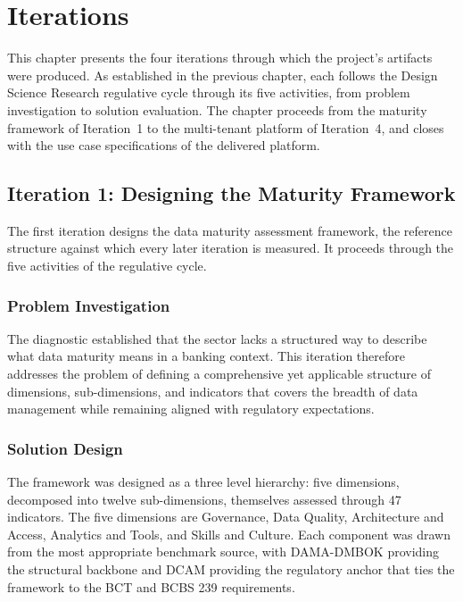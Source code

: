 
\section{Iterations}

This chapter presents the four iterations through which the project's artifacts were produced. As established in the previous chapter, each follows the Design Science Research regulative cycle through its five activities, from problem investigation to solution evaluation. The chapter proceeds from the maturity framework of Iteration~1 to the multi-tenant platform of Iteration~4, and closes with the use case specifications of the delivered platform.

\subsection{Iteration 1: Designing the Maturity Framework}

The first iteration designs the data maturity assessment framework, the reference structure against which every later iteration is measured. It proceeds through the five activities of the regulative cycle.

\subsubsection{Problem Investigation}

The diagnostic established that the sector lacks a structured way to describe what data maturity means in a banking context. This iteration therefore addresses the problem of defining a comprehensive yet applicable structure of dimensions, sub-dimensions, and indicators that covers the breadth of data management while remaining aligned with regulatory expectations.

\subsubsection{Solution Design}

The framework was designed as a three level hierarchy: five dimensions, decomposed into twelve sub-dimensions, themselves assessed through 47 indicators. The five dimensions are Governance, Data Quality, Architecture and Access, Analytics and Tools, and Skills and Culture. Each component was drawn from the most appropriate benchmark source, with DAMA-DMBOK providing the structural backbone and DCAM providing the regulatory anchor that ties the framework to the BCT and BCBS 239 requirements.

